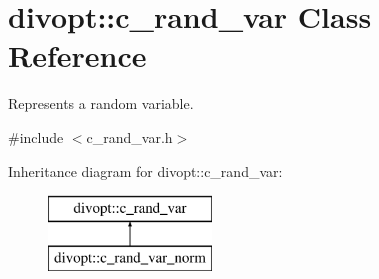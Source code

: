 \hypertarget{classdivopt_1_1c__rand__var}{\section{divopt\-:\-:c\-\_\-rand\-\_\-var \-Class \-Reference}
\label{classdivopt_1_1c__rand__var}
}


\-Represents a random variable.  




{\ttfamily \#include $<$c\-\_\-rand\-\_\-var.\-h$>$}

\-Inheritance diagram for divopt\-:\-:c\-\_\-rand\-\_\-var\-:\begin{figure}[H]
\begin{center}
\leavevmode
\includegraphics[height=2.000000cm]{classdivopt_1_1c__rand__var}
\end{center}
\end{figure}
